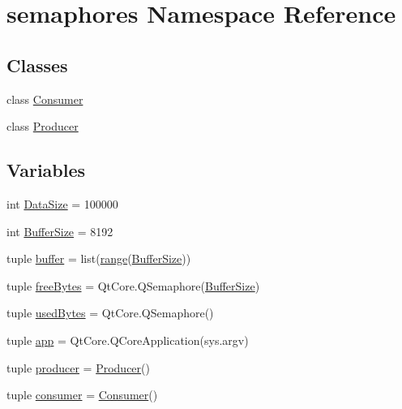 \hypertarget{namespacesemaphores}{}\section{semaphores Namespace Reference}
\label{namespacesemaphores}
\subsection*{Classes}
\begin{DoxyCompactItemize}
\item 
class \hyperlink{classsemaphores_1_1Consumer}{Consumer}
\item 
class \hyperlink{classsemaphores_1_1Producer}{Producer}
\end{DoxyCompactItemize}
\subsection*{Variables}
\begin{DoxyCompactItemize}
\item 
int \hyperlink{namespacesemaphores_a5d7101533aa63ae91436bda1ada0f97f}{Data\+Size} = 100000
\item 
int \hyperlink{namespacesemaphores_a24fd80556c5528c81a40dd1db81a6acd}{Buffer\+Size} = 8192
\item 
tuple \hyperlink{namespacesemaphores_a369f140580bf2673df41a072ca7833b2}{buffer} = list(\hyperlink{numinquire_8h_a35e47346e37a09731e9c2d704288937d}{range}(\hyperlink{namespacesemaphores_a24fd80556c5528c81a40dd1db81a6acd}{Buffer\+Size}))
\item 
tuple \hyperlink{namespacesemaphores_a00322f5648ba975dc23e9135233b5194}{free\+Bytes} = Qt\+Core.\+Q\+Semaphore(\hyperlink{namespacesemaphores_a24fd80556c5528c81a40dd1db81a6acd}{Buffer\+Size})
\item 
tuple \hyperlink{namespacesemaphores_a6ada4685bc431d22072f34ca03958454}{used\+Bytes} = Qt\+Core.\+Q\+Semaphore()
\item 
tuple \hyperlink{namespacesemaphores_a0b78d83b02c6f606584e20a9bfb91ddc}{app} = Qt\+Core.\+Q\+Core\+Application(sys.\+argv)
\item 
tuple \hyperlink{namespacesemaphores_aa6bae6efa5f3a5d078a36acb55002276}{producer} = \hyperlink{classsemaphores_1_1Producer}{Producer}()
\item 
tuple \hyperlink{namespacesemaphores_a27596abab0131f27a9f3fa4ec522de31}{consumer} = \hyperlink{classsemaphores_1_1Consumer}{Consumer}()
\end{DoxyCompactItemize}


